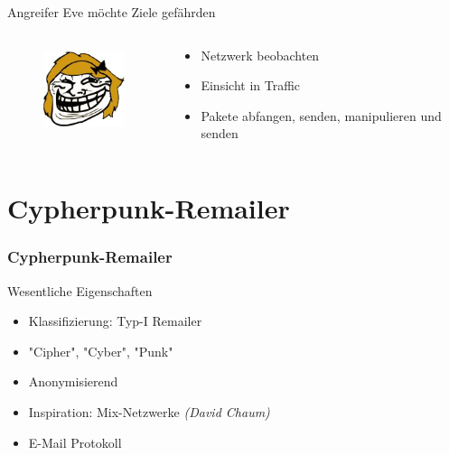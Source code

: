 \documentclass{beamer}
\begin{document}
\begin{frame}
	 {
	\begin{alertblock}{Angreifer Eve möchte Ziele gefährden}
		\begin{columns}[T]
		\begin{column}{2.5cm}
				\vspace{-.3cm}
				\begin{figure}
					\includegraphics[height=2.5cm]{bilder/eve.jpg}
				\end{figure}
		\end{column}
		\begin{column}{7cm}
			\begin{itemize}	
				\item Netzwerk beobachten
				\item Einsicht in Traffic
				\item Pakete abfangen, senden, manipulieren und senden
			\end{itemize}
		\end{column}
	\end{columns}
	\end{alertblock}
	}

\end{frame}

\section{Cypherpunk-Remailer}
\begin{frame}
	\frametitle{Cypherpunk-Remailer}
	\begin{block}{Wesentliche Eigenschaften}
		\begin{itemize}
			\item Klassifizierung: Typ-I Remailer
			\pause
			\item "Cipher", "Cyber", "Punk"
			\pause
			\item Anonymisierend
			\pause
			\item Inspiration: Mix-Netzwerke \textit{(David Chaum)}
			\pause
			\item E-Mail Protokoll
		\end{itemize}
	\end{block}
\end{frame}
\end{document}
